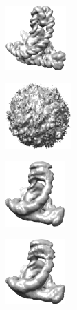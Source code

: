 \begin{figure}[t]
    \begin{subfigure}[b]{0.17\linewidth}
        \centering
        \includegraphics[height=2.5cm]{figures/5j0n_fullcvg_uniformS2_noise0_gt.png}
        \caption{}\label{fig:5j0n-noise0-reconstruction-true}
    \end{subfigure}
    \hfill
    \begin{subfigure}[b]{0.16\linewidth}
        \centering
        \includegraphics[height=2.5cm]{figures/5j0n_fullcvg_uniformS2_noise0_rand.png}
        \caption{}
    \end{subfigure}
    \hfill
    \begin{subfigure}[b]{0.15\linewidth}
        \centering
        \includegraphics[height=2.5cm]{figures/5j0n_fullcvg_uniformS2_noise0_apr.png}
        \caption{}\label{fig:5j0n-noise0-reconstruction-recovered}
    \end{subfigure}
    \hfill
    \begin{subfigure}[b]{0.15\linewidth}
        \centering
        \includegraphics[height=2.5cm]{figures/5j0n_fullcvg_uniformS2_noise16_apr.png}
        \caption{}\label{fig:5j0n-noise16-reconstruction-recovered}
    \end{subfigure}
    \hfill
    \begin{subfigure}[b]{0.30\linewidth}
        \centering

\end{subfigure}
\end{figure}
